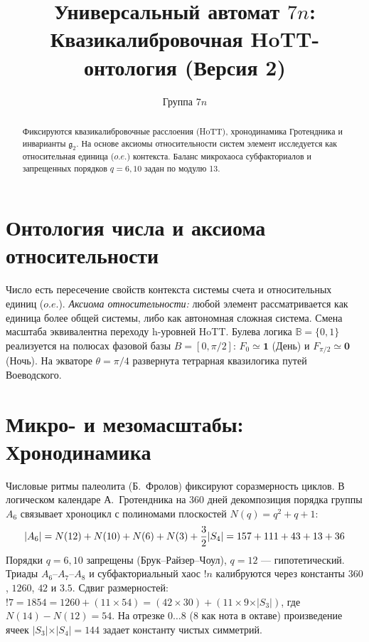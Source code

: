 \documentclass[10pt,twocolumn,fleqn]{article}
\title{\vspace{-4ex}\small\bf Универсальный автомат $7n$: Квазикалибровочная HoTT-онтология (Версия 2)}
\author{\small Группа $7n$}\date{\vspace{-9ex}}
\begin{document}
\maketitle

\begin{abstract}
\tiny Фиксируются квазикалибровочные расслоения (HoTT), хронодинамика Гротендника и инварианты $\mathfrak{g}_2$. На основе аксиомы относительности систем элемент исследуется как относительная единица ($o.e.$) контекста. Баланс микрохаоса субфакториалов и запрещенных порядков $q=6,10$ задан по модулю 13.
\end{abstract}

\section{Онтология числа и аксиома относительности}
Число есть пересечение свойств контекста системы счета и относительных единиц ($o.e.$). \textit{Аксиома относительности:} любой элемент рассматривается как единица более общей системы, либо как автономная сложная система. Смена масштаба эквивалентна переходу h-уровней HoTT. Булева логика $\mathbb{B}=\{0,1\}$ реализуется на полюсах фазовой базы $B=[0, \pi/2]$: $F_0 \simeq \mathbf{1}$ (День) и $F_{\pi/2} \simeq \mathbf{0}$ (Ночь). На экваторе $\theta = \pi/4$ развернута тетрарная квазилогика путей Воеводского.

\section{Микро- и мезомасштабы: Хронодинамика}
Числовые ритмы палеолита (Б.~Фролов) фиксируют соразмерность циклов. В логическом календаре А.~Гротендника на 360 дней декомпозиция порядка группы $A_6$ связывает хроноцикл с полиномами плоскостей $N(q) = q^2 + q + 1$:
\begin{equation}\small
    \vert A_6 \vert = N(12) + N(10) + N(6) + N(3) + \frac{3}{2}\vert S_4 \vert = 157 + 111 + 43 + 13 + 36
\end{equation}
Порядки $q=6,10$ запрещены (Брук--Райзер--Чоул), $q=12$ --- гипотетический. Триады $A_6\text{--}A_7\text{--}A_8$ и субфакториальный хаос $!n$ калибруются через константы $360$, $1260$, $42$ и $3.5$. Сдвиг размерностей: $!7 = 1854 = 1260 + (11 \times 54) = (42 \times 30) + (11 \times 9 \times \vert S_3 \vert)$, где $N(14) - N(12) = 54$. На отрезке $0 \dots 8$ (8 как нота в октаве) произведение ячеек $\vert S_3 \vert \times \vert S_4 \vert = 144$ задает константу чистых симметрий.
\end{document}
